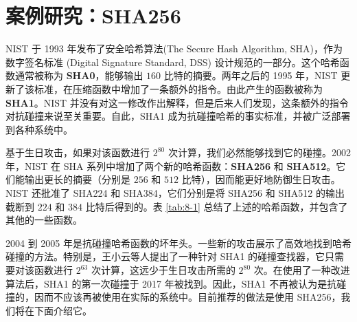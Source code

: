 \section{案例研究：SHA256}\label{sec:8-6}

NIST 于 1993 年发布了安全哈希算法(The Secure Hash Algorithm, SHA)，作为数字签名标准 (Digital Signature Standard, DSS) 设计规范的一部分。这个哈希函数通常被称为 \textbf{SHA0}，能够输出 $160$ 比特的摘要。两年之后的 1995 年，NIST 更新了该标准，在压缩函数中增加了一条额外的指令。由此产生的函数被称为 \textbf{SHA1}。NIST 并没有对这一修改作出解释，但是后来人们发现，这条额外的指令对抗碰撞来说至关重要。自此，SHA1 成为抗碰撞哈希的事实标准，并被广泛部署到各种系统中。

基于生日攻击，如果对该函数进行 $2^{80}$ 次计算，我们必然能够找到它的碰撞。2002 年，NIST 在 SHA 系列中增加了两个新的哈希函数：\textbf{SHA256} 和 \textbf{SHA512}。它们能输出更长的摘要（分别是 $256$ 和 $512$ 比特），因而能更好地防御生日攻击。NIST 还批准了 SHA224 和 SHA384，它们分别是将 SHA256 和 SHA512 的输出截断到 $224$ 和 $384$ 比特后得到的。表 \ref{tab:8-1} 总结了上述的哈希函数，并包含了其他的一些函数。

2004 到 2005 年是抗碰撞哈希函数的坏年头。一些新的攻击展示了高效地找到哈希碰撞的方法。特别是，王小云等人提出了一种针对 SHA1 的碰撞查找器，它只需要对该函数进行 $2^{63}$ 次计算，这远少于生日攻击所需的 $2^{80}$ 次。在使用了一种改进算法后，SHA1 的第一次碰撞于 2017 年被找到。因此，SHA1 不再被认为是抗碰撞的，因而不应该再被使用在实际的系统中。目前推荐的做法是使用 SHA256，我们将在下面介绍它。

